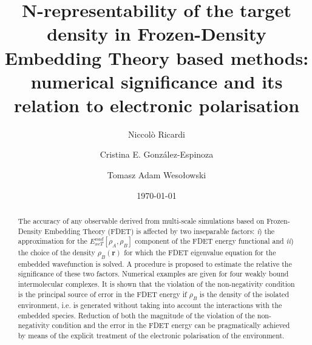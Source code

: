 \documentclass[amsmath,amssymb,preprint,aip,jcp]{revtex4-1}
\begin{document}
\author{Niccol\`{o} Ricardi}
\author{Cristina E. Gonz\'{a}lez-Espinoza}
\author{Tomasz Adam Weso\l{}owski}
% 
\date{\today}
\title{{\color{red}N-representability of the target density in Frozen-Density Embedding Theory based methods: numerical significance and its relation to electronic polarisation}
}
 
\begin{abstract}
The accuracy of any observable derived from multi-scale simulations based on Frozen-Density Embedding Theory (FDET) is affected by two inseparable factors: {\it i}) the approximation for the  ${E}_{xcT}^{nad}[\rho_A,\rho_B]$ 
{\color{red} component of the FDET energy functional} and  {\it ii}) the choice of the density $\rho_B(\mathbf{r})$
for which the FDET eigenvalue equation for the embedded wavefunction is solved.
{\color{red}A  procedure is proposed to estimate the relative the significance of these two factors.
Numerical examples  are given for four weakly bound intermolecular complexes.}
%
It is shown that the violation of the non-negativity condition is the principal source of error in the FDET energy
if $\rho_B$ is the density of the isolated environment, i.e. is generated without taking into account the interactions with the embedded species.
Reduction of both the magnitude of the violation of the non-negativity condition and the error in the FDET energy can be pragmatically achieved by means of the explicit treatment of the electronic polarisation of the environment.

\end{abstract}

\maketitle
%
%
%
%
%
\end{document}
